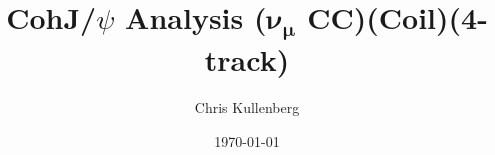 \title{CohJ/$\psi$ Analysis ($\boldsymbol{\nu_\mu}$ \textbf{CC})(\textbf{Coil})(\textbf{4-track})}
\author{Chris Kullenberg}
\date{\today}
